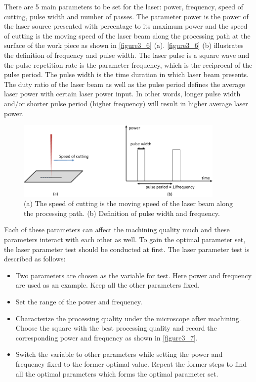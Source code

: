 There are 5 main parameters to be set for the laser: power, frequency, speed of cutting, pulse width and number of passes. The parameter power is the power of the laser source presented with percentage to its maximum power and the speed of cutting is the moving speed of the laser beam along the processing path at the surface of the work piece as shown in \autoref{figure3_6} (a). \autoref{figure3_6} (b) illustrates the definition of frequency and pulse width. The laser pulse is a square wave and the pulse repetition rate is the parameter frequency, which is the reciprocal of the pulse period. The pulse width is the time duration in which laser beam presents. The duty ratio of the laser beam as well as the pulse period defines the average laser power with certain laser power input. In other words, longer pulse width and/or shorter pulse period (higher frequency) will result in higher average laser power.\\

\begin{figure}[b]%
\centering
\includegraphics[width=0.9\textwidth]{figures/designandfabrication/figure3_6}%
\caption{(a) The speed of cutting is the moving speed of the laser beam along the processing path. (b) Definition of pulse width and frequency.}%
\label{figure3_6}%
\end{figure}

Each of these parameters can affect the machining quality much and these parameters interact with each other as well. To gain the optimal parameter set, the laser parameter test should be conducted at first. The laser parameter test is described as follows:\\

\begin{itemize}
	\item Two parameters are chosen as the variable for test. Here power and frequency are used as an example. Keep all the other parameters fixed.
	\item Set the range of the power and frequency.
	\item Characterize the processing quality under the microscope after machining. Choose the square with the best processing quality and record the corresponding power and frequency as shown in \autoref{figure3_7}.
	\item Switch the variable to other parameters while setting the power and frequency fixed to the former optimal value. Repeat the former steps to find all the optimal parameters which forms the optimal parameter set.
\end{itemize}

